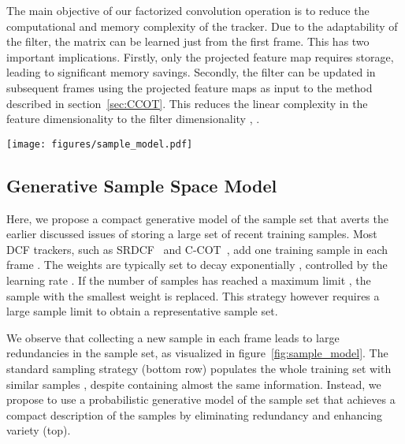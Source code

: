 \documentclass[10pt,twocolumn,letterpaper]{article}
\begin{document}
The main objective of our factorized convolution operation is to reduce the computational and memory complexity of the tracker. Due to the adaptability of the filter, the matrix  can be learned just from the first frame. This has two important implications. Firstly, only the projected feature map  requires storage, leading to significant memory savings. Secondly, the filter can be updated in subsequent frames using the projected feature maps  as input to the method described in section~\ref{sec:CCOT}. This reduces the linear complexity in the feature dimensionality  to the filter dimensionality , \ie .

\begin{figure*}[!t]
	\centering \newcommand{\wid}{0.86\textwidth}\texttt{[image: figures/sample\_model.pdf]}\vspace{-2mm}
	\caption{Visualization of the training set representation in the baseline C-COT (bottom row) and our method (top row). In C-COT, the training set consists of a sequence of consecutive samples. This introduces large redundancies due to slow change in appearance, while previous aspects of the appearance are forgotten. This can cause over-fitting to recent samples. Instead, we model the training data as a mixture of Gaussian components, where each component represent a different aspect of the appearance. Our approach yields a compact yet diverse representation of the data, thereby reducing the risk of over-fitting.
	}\vspace{-3mm}\label{fig:sample_model}
\end{figure*}

\subsection{Generative Sample Space Model}
\label{sec:sample_model}

Here, we propose a compact generative model of the sample set that averts the earlier discussed issues of storing a large set of recent training samples. Most DCF trackers, such as SRDCF~\cite{DanelljanICCV2015} and C-COT~\cite{DanelljanECCV2016}, add one training sample  in each frame . The weights are typically set to decay exponentially , controlled by the learning rate . If the number of samples has reached a maximum limit , the sample with the smallest weight  is replaced. This strategy however requires a large sample limit  to obtain a representative sample set.

We observe that collecting a new sample in each frame leads to large redundancies in the sample set, as visualized in figure~\ref{fig:sample_model}. The standard sampling strategy (bottom row) populates the whole training set with similar samples , despite containing almost the same information. Instead, we propose to use a probabilistic generative model of the sample set that achieves a compact description of the samples by eliminating redundancy and enhancing variety (top).
\end{document}
